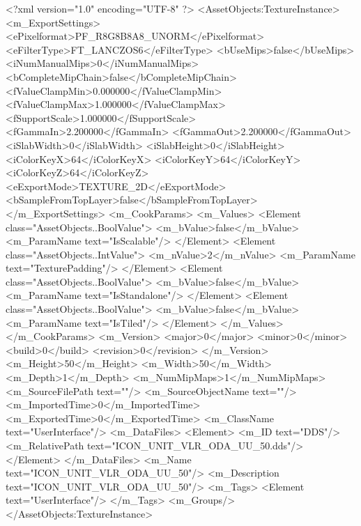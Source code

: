<?xml version="1.0" encoding="UTF-8" ?>
<AssetObjects:TextureInstance>
<m_ExportSettings>
<ePixelformat>PF_R8G8B8A8_UNORM</ePixelformat>
<eFilterType>FT_LANCZOS6</eFilterType>
<bUseMips>false</bUseMips>
<iNumManualMips>0</iNumManualMips>
<bCompleteMipChain>false</bCompleteMipChain>
<fValueClampMin>0.000000</fValueClampMin>
<fValueClampMax>1.000000</fValueClampMax>
<fSupportScale>1.000000</fSupportScale>
<fGammaIn>2.200000</fGammaIn>
<fGammaOut>2.200000</fGammaOut>
<iSlabWidth>0</iSlabWidth>
<iSlabHeight>0</iSlabHeight>
<iColorKeyX>64</iColorKeyX>
<iColorKeyY>64</iColorKeyY>
<iColorKeyZ>64</iColorKeyZ>
<eExportMode>TEXTURE_2D</eExportMode>
<bSampleFromTopLayer>false</bSampleFromTopLayer>
</m_ExportSettings>
<m_CookParams>
<m_Values>
<Element class="AssetObjects..BoolValue">
<m_bValue>false</m_bValue>
<m_ParamName text="IsScalable"/>
</Element>
<Element class="AssetObjects..IntValue">
<m_nValue>2</m_nValue>
<m_ParamName text="TexturePadding"/>
</Element>
<Element class="AssetObjects..BoolValue">
<m_bValue>false</m_bValue>
<m_ParamName text="IsStandalone"/>
</Element>
<Element class="AssetObjects..BoolValue">
<m_bValue>false</m_bValue>
<m_ParamName text="IsTiled"/>
</Element>
</m_Values>
</m_CookParams>
<m_Version>
<major>0</major>
<minor>0</minor>
<build>0</build>
<revision>0</revision>
</m_Version>
<m_Height>50</m_Height>
<m_Width>50</m_Width>
<m_Depth>1</m_Depth>
<m_NumMipMaps>1</m_NumMipMaps>
<m_SourceFilePath text=""/>
<m_SourceObjectName text=""/>
<m_ImportedTime>0</m_ImportedTime>
<m_ExportedTime>0</m_ExportedTime>
<m_ClassName text="UserInterface"/>
<m_DataFiles>
<Element>
<m_ID text="DDS"/>
<m_RelativePath text="ICON_UNIT_VLR_ODA_UU_50.dds"/>
</Element>
</m_DataFiles>
<m_Name text="ICON_UNIT_VLR_ODA_UU_50"/>
<m_Description text="ICON_UNIT_VLR_ODA_UU_50"/>
<m_Tags>
<Element text="UserInterface"/>
</m_Tags>
<m_Groups/>
</AssetObjects:TextureInstance>
